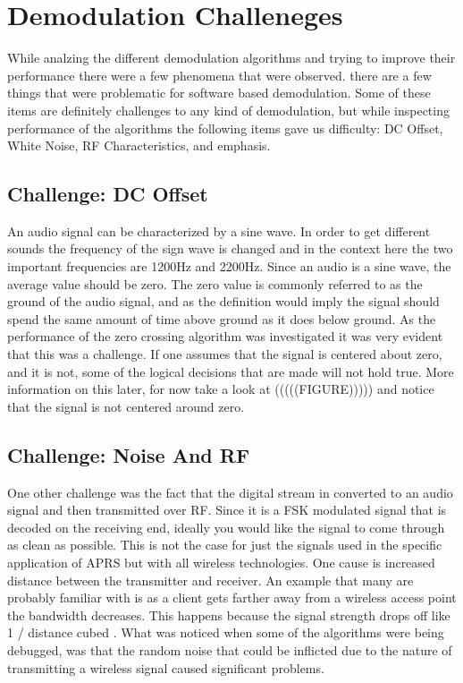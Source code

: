 \chapter{Demodulation Challeneges}
While analzing the different demodulation algorithms and trying to improve their performance there were a few phenomena that were observed. there are a few things that were problematic for software based demodulation. Some of these items are definitely challenges to any kind of demodulation, but while inspecting performance of the algorithms the following items gave us difficulty: DC Offset, White Noise, RF Characteristics, and emphasis.

\section{Challenge: DC Offset}
An audio signal can be characterized by a sine wave. In order to get different sounds the frequency of the sign wave is changed and in the context here the two important frequencies are 1200Hz and 2200Hz. Since an audio is a sine wave, the average value should be zero. The zero value is commonly referred to as the ground of the audio signal, and as the definition would imply the signal should spend the same amount of time above ground as it does below ground. As the performance of the zero crossing algorithm was investigated it was very evident that this was a challenge. If one assumes that the signal is centered about zero, and it is not, some of the logical decisions that are made will not hold true. More information on this later, for now take a look at (((((FIGURE))))) and notice that the signal is not centered around zero.

\section{Challenge: Noise And RF}
One other challenge was the fact that the digital stream in converted to an audio signal and then transmitted over RF. Since it is a FSK modulated signal that is decoded on the receiving end, ideally you would like the signal to come through as clean as possible. This is not the case for just the signals used in the specific application of APRS but with all wireless technologies. One cause is increased distance between the transmitter and receiver. An example that many are probably familiar with is as a client gets farther away from a wireless access point the bandwidth decreases. This happens because the signal strength drops off like 1 / distance cubed \cite{4Gon}. What was noticed when some of the algorithms were being debugged, was that the random noise that could be inflicted due to the nature of transmitting a wireless signal caused significant problems.


